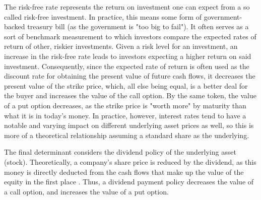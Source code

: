\documentclass[english,12pt,a4paper,pdftex,sci,utf8]{aaltothesis}
\begin{document}
The risk-free rate represents the return on investment one can expect from a so called risk-free investment. In practice, this means some form of government-backed treasury bill (as the government is "too big to fail"). It often serves as a sort of benchmark measurement to which investors compare the expected rates of return of other, riskier investments. Given a risk level for an investment, an increase in the risk-free rate leads to investors expecting a higher return on said investment. Consequently, since the expected rate of return is often used as the discount rate for obtaining the present value of future cash flows, it decreases the present value of the strike price, which, all else being equal, is a better deal for the buyer and increases the value of the call option. By the same token, the value of a put option decreases, as the strike price is "worth more" by maturity than what it is in today's money. In practice, however, interest rates tend to have a notable and varying impact on different underlying asset prices as well, so this is more of a theoretical relationship assuming a standard share as the underlying.

The final determinant considers the dividend policy of the underlying asset (stock). Theoretically, a company's share price is reduced by the dividend, as this money is directly deducted from the cash flows that make up the value of the equity in the first place \cite{modigliani1958cost}. Thus, a dividend payment policy decreases the value of a call option, and increases the value of a put option.
\end{document}
